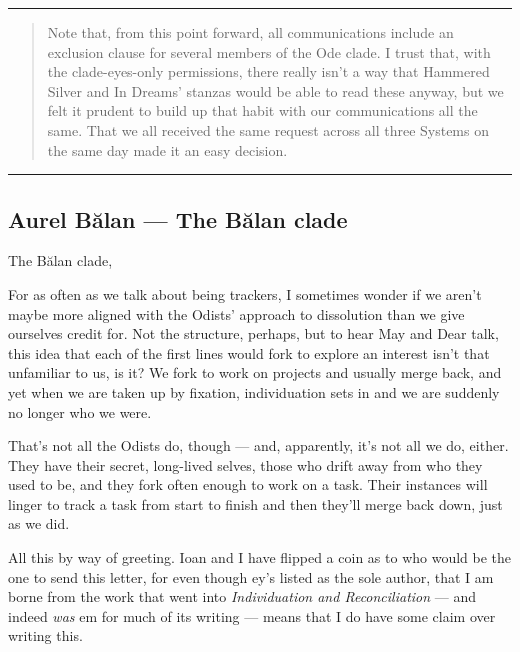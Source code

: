 \begin{center}\rule{0.5\linewidth}{0.5pt}\end{center}

\begin{quote}
Note that, from this point forward, all communications include an exclusion clause for several members of the Ode clade. I trust that, with the clade-eyes-only permissions, there really isn't a way that Hammered Silver and In Dreams' stanzas would be able to read these anyway, but we felt it prudent to build up that habit with our communications all the same. That we all received the same request across all three Systems on the same day made it an easy decision.
\end{quote}

\begin{center}\rule{0.5\linewidth}{0.5pt}\end{center}

\hypertarget{aurel-bux103lan-the-bux103lan-clade}{%
\subsection{Aurel Bălan — The Bălan clade}\label{aurel-bux103lan-the-bux103lan-clade}}

The Bălan clade,

For as often as we talk about being trackers, I sometimes wonder if we aren't maybe more aligned with the Odists' approach to dissolution than we give ourselves credit for. Not the structure, perhaps, but to hear May and Dear talk, this idea that each of the first lines would fork to explore an interest isn't that unfamiliar to us, is it? We fork to work on projects and usually merge back, and yet when we are taken up by fixation, individuation sets in and we are suddenly no longer who we were.

That's not all the Odists do, though — and, apparently, it's not all we do, either. They have their secret, long-lived selves, those who drift away from who they used to be, and they fork often enough to work on a task. Their instances will linger to track a task from start to finish and then they'll merge back down, just as we did.

All this by way of greeting. Ioan and I have flipped a coin as to who would be the one to send this letter, for even though ey's listed as the sole author, that I am borne from the work that went into \emph{Individuation and Reconciliation} — and indeed \emph{was} em for much of its writing — means that I do have some claim over writing this.

